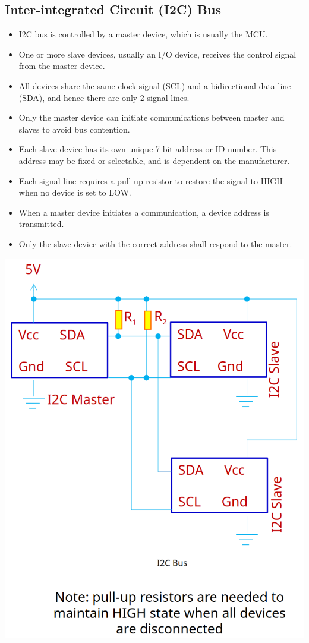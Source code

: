 \documentclass[11pt]{article}
\begin{document}
\subsection{Inter-integrated Circuit (I2C) Bus}
\label{sec:orgc9c4ccf}
\begin{itemize}
\item I2C bus is controlled by a master device, which is usually the MCU.
\item One or more slave devices, usually an I/O device, receives the control signal from the master device.
\item All devices share the same clock signal (SCL) and a bidirectional data line (SDA), and hence there are only 2 signal lines.
\item Only the master device can initiate communications between master and slaves to avoid bus contention.
\item Each slave device has its own unique 7-bit address or ID number. This address may be fixed or selectable, and is dependent on the manufacturer.
\item Each signal line requires a pull-up resistor to restore the signal to HIGH when no device is set to LOW.
\item When a master device initiates a communication, a device address is transmitted.
\item Only the slave device with the correct address shall respond to the master.
\end{itemize}

\begin{center}
\includegraphics[scale=0.6]{./images/i2c-bus-diagram.png}
\end{center}
\end{document}
